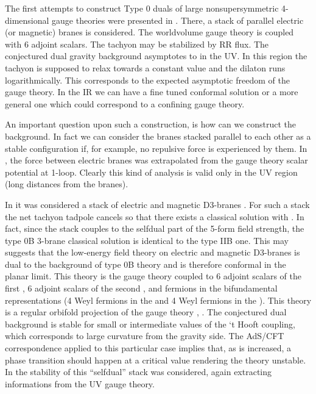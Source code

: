 \documentclass[a4paper,12pt]{article}
\begin{document}
The first attempts to construct Type 0 duals of large \coordHE{} nonsupersymmetric
4-dimensional gauge theories were presented in \cite{kt}. There, a stack of 
\coordHE{} parallel electric (or magnetic) branes is considered. The worldvolume 
gauge theory is \coordHE{} coupled with 6 adjoint scalars. The tachyon may be stabilized by RR flux. The conjectured dual gravity background asymptotes to 
\coordHE{} in the UV. In this region the tachyon is supposed to relax towards a constant value and the dilaton runs logarithmically. This corresponds to the expected asymptotic freedom of the gauge theory. In the IR we can have a fine tuned conformal solution \cite{kt0} or a more general one \cite{minahan} which could correspond to a confining gauge theory.
 
An important question upon such a construction, is how can we construct the
background. In fact we can consider the branes stacked parallel to each other 
as a stable configuration if, for example, no repulsive force is experienced
by them. In \cite{z}, \cite{tz} the force between electric branes was 
extrapolated from the gauge theory scalar potential at 1-loop. Clearly this kind of analysis is valid only in the UV region (long distances from the branes).

In \cite{kt1} it was considered a stack of \coordHE{} electric and \coordHE{} magnetic D3-branes . For such a stack the net tachyon tadpole cancels so that there
exists a classical solution with \coordHE{}. In fact, since the stack couples
to the selfdual part of the 5-form field strength, the type 0B 3-brane classical solution is identical to the type IIB one. This may suggests that 
the low-energy field theory on \coordHE{} electric and \coordHE{} magnetic D3-branes is dual to the \coordHE{} background of type 0B theory and is therefore conformal in the planar limit. This theory is the \coordHE{} gauge theory coupled to 6 adjoint scalars of the first \coordHE{}, 6 adjoint scalars of the second \coordHE{}, and fermions in the bifundamental representations (4 Weyl fermions in the \coordHE{} and 4 Weyl fermions in the \coordHE{}). This theory is a regular \coordHE{} orbifold projection of the \coordHE{}  \coordHE{} gauge 
theory \cite{kt1}, \cite{ns}. The conjectured dual background is stable for small or intermediate
values of the `t Hooft coupling, which corresponds to large curvature from the gravity 
side. The AdS/CFT correspondence applied to this particular case implies \cite{k} that, 
as \coordHE{} is increased, a phase transition should happen at a critical 
value \coordHE{} rendering the theory unstable.
In \cite{tz} the stability of this ``selfdual'' stack was considered, again
extracting informations from the UV gauge theory.
\end{document}
